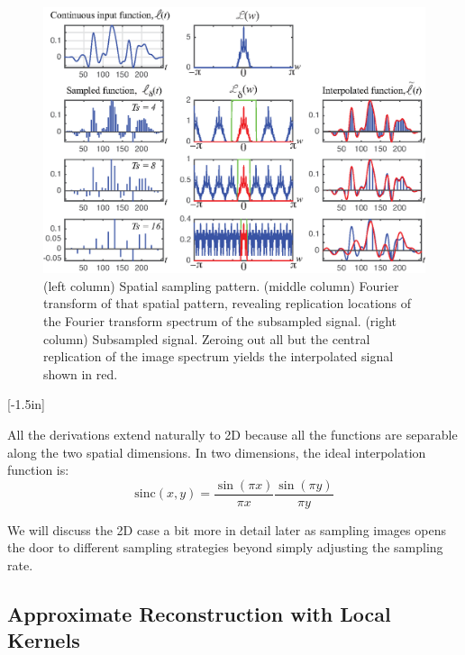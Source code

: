 \begin{figure}
    \includegraphics[width=1\linewidth]{figures/Image_processing_sampling/sampling_FT4.eps}
    \caption{(left column)  Spatial sampling
        pattern.  (middle column)  Fourier transform of that spatial pattern,
        revealing replication locations of the Fourier
        transform spectrum of the subsampled signal.  (right column) Subsampled signal.  Zeroing out all but the central
        replication of the image spectrum yields the
        interpolated signal shown in red.
    }
    \label{fig:alias1d}
\end{figure}

[-1.5in]


All the derivations extend naturally to 2D because all the functions are separable along the two spatial dimensions. In two dimensions, the ideal interpolation function is:
\begin{equation}
    \text{sinc} (x,y)  = \frac{\sin (\pi x)}{\pi x} \frac{\sin (\pi y)}{\pi y}
\end{equation}

We will discuss the 2D case a bit more in detail later as sampling images opens the door to different sampling strategies beyond simply adjusting the sampling rate.

\subsection{Approximate Reconstruction with Local Kernels}

